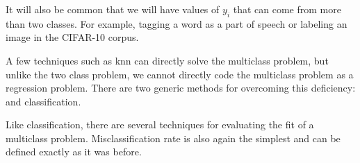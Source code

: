 \documentclass[xetex,mathserif,serif,aspectratio=169]{beamer}
\begin{document}
\begin{frame}[fragile] \frametitle{} \oldB \small

\textbf{}

It will also be common that we will have values of $y_i$ that can come from
more than two classes. For example, tagging a word as a part of speech or
labeling an image in the CIFAR-10 corpus.

\pause A few techniques such as knn can directly solve the multiclass problem,
but unlike the two class problem, we cannot directly code the multiclass problem
as a regression problem. There are two generic methods for overcoming this
deficiency:  and  classification.

\pause Like classification, there are several techniques for evaluating the
fit of a multiclass problem. Misclassification rate is also again the simplest
and can be defined exactly as it was before.

\end{frame}
\end{document}
